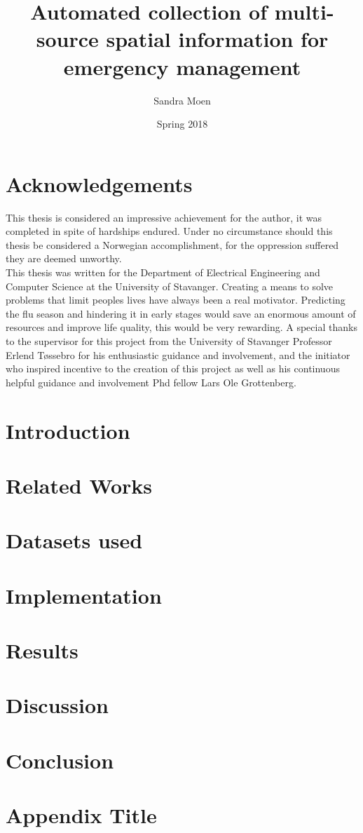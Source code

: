 \documentclass[12pt, twoside]{report}
\title{Automated collection of multi-source spatial information for emergency management}
\author{Sandra Moen}
\date{Spring 2018}
\begin{document}






\chapter*{Acknowledgements}
This thesis is considered an impressive achievement for the author, it was completed in spite of hardships endured. Under no circumstance should this thesis be considered a Norwegian accomplishment, for the oppression suffered they are deemed unworthy.
\newline \\
This thesis was written for the Department of Electrical Engineering and Computer Science at the University of Stavanger. Creating a means to solve problems that limit peoples lives have always been a real motivator. Predicting the flu season and hindering it in early stages would save an enormous amount of resources and improve life quality, this would be very rewarding. A special thanks to the supervisor for this project from the University of Stavanger Professor Erlend Tøssebro for his enthusiastic guidance and involvement, and the initiator who inspired incentive to the creation of this project as well as his continuous helpful guidance and involvement Phd fellow Lars Ole Grottenberg.

\setcounter{secnumdepth}{5}
\setcounter{tocdepth}{5}
\tableofcontents
\listoffigures
\listoftables

\chapter{Introduction}


\chapter{Related Works}


\chapter{Datasets used}


\chapter{Implementation}


\chapter{Results}


\chapter{Discussion}


\chapter{Conclusion}


\appendix
\chapter{Appendix Title}



\end{document}
